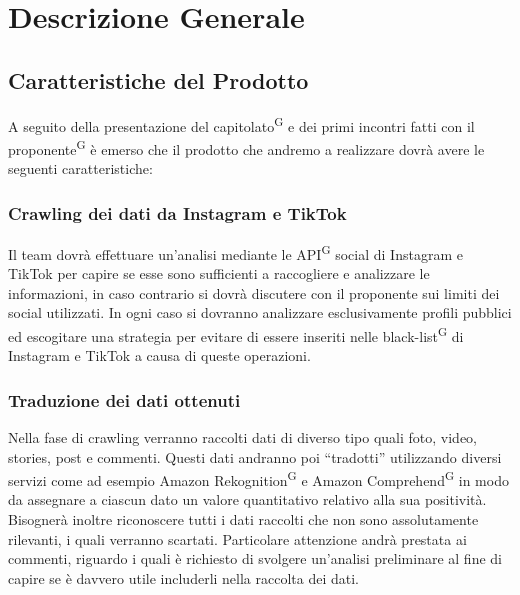 \section{Descrizione Generale}

\subsection{Caratteristiche del Prodotto}

A seguito della presentazione del capitolato\textsuperscript{G} e dei primi incontri fatti con il proponente\textsuperscript{G} è emerso che il prodotto che andremo a realizzare dovrà avere le seguenti caratteristiche:

\subsubsection{Crawling dei dati da Instagram e TikTok}
Il team dovrà effettuare un’analisi mediante le API\textsuperscript{G} social di Instagram e TikTok per capire se esse sono sufficienti a raccogliere e analizzare le informazioni, in caso contrario si dovrà discutere con il proponente sui limiti dei social utilizzati. In ogni caso si dovranno analizzare esclusivamente profili pubblici ed escogitare una strategia per evitare di essere inseriti nelle black-list\textsuperscript{G} di Instagram e TikTok a causa di queste operazioni.

\subsubsection{Traduzione dei dati ottenuti}
Nella fase di crawling verranno raccolti dati di diverso tipo quali foto, video, stories, post e commenti. Questi dati andranno poi “tradotti” utilizzando diversi servizi come ad esempio Amazon Rekognition\textsuperscript{G} e Amazon Comprehend\textsuperscript{G} in modo da assegnare a ciascun dato un valore quantitativo relativo alla sua positività. Bisognerà inoltre riconoscere tutti i dati raccolti che non sono assolutamente rilevanti, i quali verranno scartati. Particolare attenzione andrà prestata ai commenti, riguardo i quali è richiesto di svolgere un’analisi preliminare al fine di capire se è davvero utile includerli nella raccolta dei dati.

